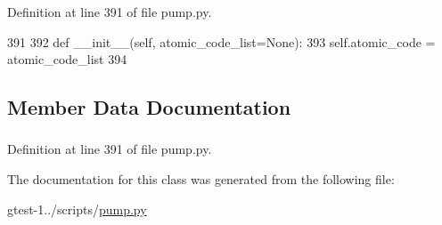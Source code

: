 \-Definition at line 391 of file pump.\-py.


\begin{DoxyCode}
391 
392   def __init__(self, atomic_code_list=None):
393     self.atomic_code = atomic_code_list
394 

\end{DoxyCode}


\subsection{\-Member \-Data \-Documentation}
\hypertarget{classpump_1_1CodeNode_a37b98239728299970150b73c1a05c287}{
\subsubsection[{atomic\-\_\-code}]{}}\label{d8/d35/classpump_1_1CodeNode_a37b98239728299970150b73c1a05c287}


\-Definition at line 391 of file pump.\-py.



\-The documentation for this class was generated from the following file\-:\begin{DoxyCompactItemize}
\item 
gtest-\/1../scripts/\hyperlink{pump_8py}{pump.\-py}\end{DoxyCompactItemize}
